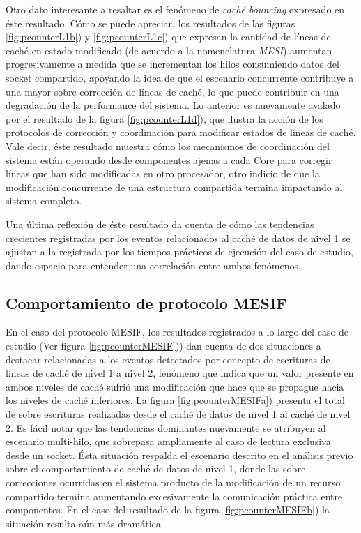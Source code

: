 Otro dato interesante a resaltar es el fenómeno de \emph{caché bouncing} expresado en éste resultado. Cómo se puede apreciar, los resultados de las figuras \ref{fig:pcounterL1b}) y \ref{fig:pcounterL1c}) que expresan la cantidad de líneas de caché en estado modificado (de acuerdo a la nomenclatura \emph{MESI}) aumentan progresivamente a medida que se incrementan los hilos consumiendo datos del socket compartido, apoyando la idea de que el escenario concurrente contribuye a una mayor sobre corrección de líneas de caché, lo que puede contribuir en una degradación de la performance del sistema. Lo anterior es nuevamente avalado por el resultado de la figura \ref{fig:pcounterL1d}), que ilustra la acción de los protocolos de corrección y coordinación para modificar estados de líneas de caché. Vale decir, éste resultado muestra cómo los mecanismos de coordinación del sistema están operando desde componentes ajenas a cada Core para corregir líneas que han sido modificadas en otro procesador, otro indicio de que la modificación concurrente de una estructura compartida termina impactando al sistema completo.

Una última reflexión de éste resultado da cuenta de cómo las tendencias crecientes registradas por los eventos relacionados al caché de datos de nivel 1 se ajustan a la registrada por los tiempos prácticos de ejecución del caso de estudio, dando espacio para entender una correlación entre ambos fenómenos.

\subsection{Comportamiento de protocolo MESIF}
En el caso del protocolo MESIF, los resultados registrados a lo largo del caso de estudio (Ver figura \ref{fig:pcounterMESIF})) dan cuenta de dos situaciones a destacar relacionadas a los eventos detectados por concepto de escrituras de líneas de caché de nivel 1 a nivel 2, fenómeno que indica que un valor presente en ambos niveles de caché sufrió una modificación que hace que se propague hacia los niveles de caché inferiores.
La figura \ref{fig:pcounterMESIFa}) presenta el total de sobre escrituras realizadas desde el caché de datos de nivel 1 al caché de nivel 2. Es fácil notar que las tendencias dominantes nuevamente se atribuyen al escenario multi-hilo, que sobrepasa ampliamente al caso de lectura exclusiva desde un socket. Ésta situación respalda el escenario descrito en el análisis previo sobre el comportamiento de caché de datos de nivel 1, donde las sobre correcciones ocurridas en el sistema producto de la modificación de un recurso compartido termina aumentando excesivamente la comunicación práctica entre componentes. En el caso del resultado de la figura \ref{fig:pcounterMESIFb}) la situación resulta aún más dramática. 

